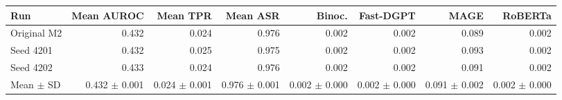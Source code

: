 \begin{tabular}{lrrrrrrr}
\toprule
Run & Mean AUROC & Mean TPR & Mean ASR & Binoc. & Fast-DGPT & MAGE & RoBERTa \\
\midrule
Original M2 & 0.432 & 0.024 & 0.976 & 0.002 & 0.002 & 0.089 & 0.002 \\
Seed 4201 & 0.432 & 0.025 & 0.975 & 0.002 & 0.002 & 0.093 & 0.002 \\
Seed 4202 & 0.433 & 0.024 & 0.976 & 0.002 & 0.002 & 0.091 & 0.002 \\
\midrule
Mean $\pm$ SD & 0.432 $\pm$ 0.001 & 0.024 $\pm$ 0.001 & 0.976 $\pm$ 0.001 & 0.002 $\pm$ 0.000 & 0.002 $\pm$ 0.000 & 0.091 $\pm$ 0.002 & 0.002 $\pm$ 0.000 \\
\bottomrule
\end{tabular}
